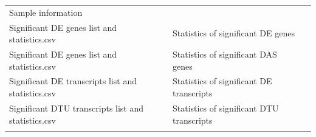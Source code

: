 \documentclass[]{article}
\begin{document}
\begin{longtable}[]{@{}lll@{}}
\begin{minipage}[t]{0.65\columnwidth}
Sample information\strut
\end{minipage} & \begin{minipage}[t]{0.02\columnwidth}\raggedright\strut
\strut
\end{minipage}\tabularnewline
\begin{minipage}[t]{0.25\columnwidth}\raggedright\strut
Significant DE genes list and statistics.csv\strut
\end{minipage} & \begin{minipage}[t]{0.65\columnwidth}\raggedright\strut
Statistics of significant DE genes\strut
\end{minipage} & \begin{minipage}[t]{0.02\columnwidth}\raggedright\strut
\strut
\end{minipage}\tabularnewline
\begin{minipage}[t]{0.25\columnwidth}\raggedright\strut
Significant DE genes list and statistics.csv\strut
\end{minipage} & \begin{minipage}[t]{0.65\columnwidth}\raggedright\strut
Statistics of significant DAS genes\strut
\end{minipage} & \begin{minipage}[t]{0.02\columnwidth}\raggedright\strut
\strut
\end{minipage}\tabularnewline
\begin{minipage}[t]{0.25\columnwidth}\raggedright\strut
Significant DE transcripts list and statistics.csv\strut
\end{minipage} & \begin{minipage}[t]{0.65\columnwidth}\raggedright\strut
Statistics of significant DE transcripts\strut
\end{minipage} & \begin{minipage}[t]{0.02\columnwidth}\raggedright\strut
\strut
\end{minipage}\tabularnewline
\begin{minipage}[t]{0.25\columnwidth}\raggedright\strut
Significant DTU transcripts list and statistics.csv\strut
\end{minipage} & \begin{minipage}[t]{0.65\columnwidth}\raggedright\strut
Statistics of significant DTU transcripts\strut
\end{minipage} & \begin{minipage}[t]{0.02\columnwidth}\raggedright\strut
\strut
\end{minipage}\tabularnewline
\begin{minipage}[t]{0.25\columnwidth}\raggedright\strut

\end{minipage}
\end{longtable}
\end{document}
